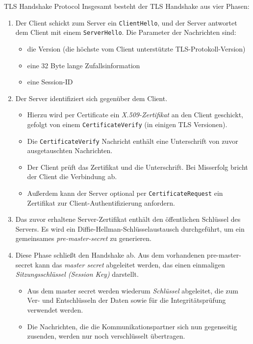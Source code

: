 \begin{defi}{TLS Handshake Protocol}
    Insgesamt besteht der TLS Handshake aus vier Phasen:
    \begin{enumerate}
        \item Der Client schickt zum Server ein \texttt{ClientHello}, und der Server antwortet dem Client mit einem \texttt{ServerHello}. Die Parameter der Nachrichten sind:
              \begin{itemize}
                  \item die Version (die höchste vom Client unterstützte TLS-Protokoll-Version)
                  \item eine 32 Byte lange Zufallsinformation
                  \item eine Session-ID
              \end{itemize}
        \item Der Server identifiziert sich gegenüber dem Client.
              \begin{itemize}
                  \item Hierzu wird per Certificate ein \emph{X.509-Zertifikat} an den Client geschickt, gefolgt von einem \texttt{CertificateVerify} (in einigen TLS Versionen).
                  \item Die \texttt{CertificateVerify} Nachricht enthält eine Unterschrift von zuvor ausgetauschten Nachrichten.
                  \item Der Client prüft das Zertifikat und die Unterschrift. Bei Misserfolg bricht der Client die Verbindung ab.
                  \item Außerdem kann der Server optional per \texttt{CertificateRequest} ein Zertifikat zur Client-Authentifizierung anfordern.
              \end{itemize}
        \item Das zuvor erhaltene Server-Zertifikat enthält den öffentlichen Schlüssel des Servers. Es wird ein Diffie-Hellman-Schlüsselaustausch durchgeführt, um ein gemeinsames \emph{pre-master-secret} zu generieren.
        \item Diese Phase schließt den Handshake ab. Aus dem vorhandenen pre-master-secret kann das \emph{master secret} abgeleitet werden, das einen einmaligen \emph{Sitzungsschlüssel (Session Key)} darstellt.
              \begin{itemize}
                  \item Aus dem master secret werden wiederum \emph{Schlüssel} abgeleitet, die zum Ver- und Entschlüsseln der Daten sowie für die Integritätsprüfung verwendet werden.
                  \item Die Nachrichten, die die Kommunikationspartner sich nun gegenseitig zusenden, werden nur noch verschlüsselt übertragen.
              \end{itemize}
    \end{enumerate}
\end{defi}

